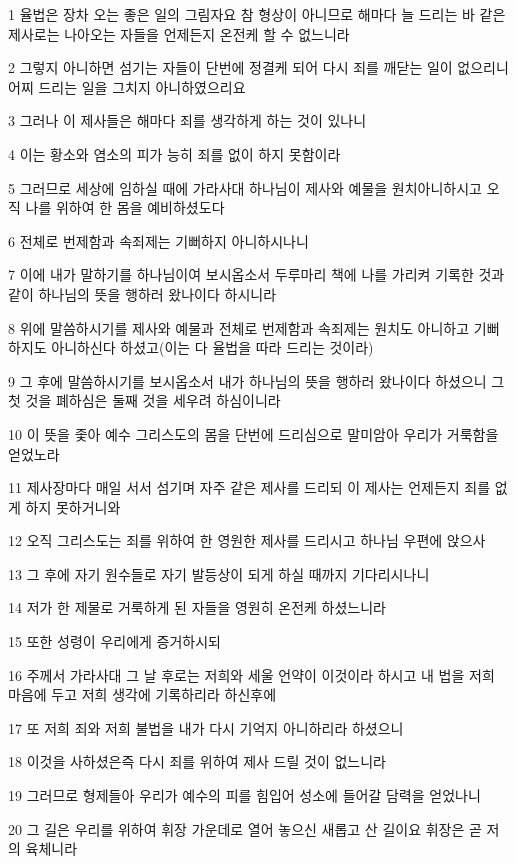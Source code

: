 \par 1 율법은 장차 오는 좋은 일의 그림자요 참 형상이 아니므로 해마다 늘 드리는 바 같은 제사로는 나아오는 자들을 언제든지 온전케 할 수 없느니라
\par 2 그렇지 아니하면 섬기는 자들이 단번에 정결케 되어 다시 죄를 깨닫는 일이 없으리니 어찌 드리는 일을 그치지 아니하였으리요
\par 3 그러나 이 제사들은 해마다 죄를 생각하게 하는 것이 있나니
\par 4 이는 황소와 염소의 피가 능히 죄를 없이 하지 못함이라
\par 5 그러므로 세상에 임하실 때에 가라사대 하나님이 제사와 예물을 원치아니하시고 오직 나를 위하여 한 몸을 예비하셨도다
\par 6 전체로 번제함과 속죄제는 기뻐하지 아니하시나니
\par 7 이에 내가 말하기를 하나님이여 보시옵소서 두루마리 책에 나를 가리켜 기록한 것과 같이 하나님의 뜻을 행하러 왔나이다 하시니라
\par 8 위에 말씀하시기를 제사와 예물과 전체로 번제함과 속죄제는 원치도 아니하고 기뻐하지도 아니하신다 하셨고(이는 다 율법을 따라 드리는 것이라)
\par 9 그 후에 말씀하시기를 보시옵소서 내가 하나님의 뜻을 행하러 왔나이다 하셨으니 그 첫 것을 폐하심은 둘째 것을 세우려 하심이니라
\par 10 이 뜻을 좇아 예수 그리스도의 몸을 단번에 드리심으로 말미암아 우리가 거룩함을 얻었노라
\par 11 제사장마다 매일 서서 섬기며 자주 같은 제사를 드리되 이 제사는 언제든지 죄를 없게 하지 못하거니와
\par 12 오직 그리스도는 죄를 위하여 한 영원한 제사를 드리시고 하나님 우편에 앉으사
\par 13 그 후에 자기 원수들로 자기 발등상이 되게 하실 때까지 기다리시나니
\par 14 저가 한 제물로 거룩하게 된 자들을 영원히 온전케 하셨느니라
\par 15 또한 성령이 우리에게 증거하시되
\par 16 주께서 가라사대 그 날 후로는 저희와 세울 언약이 이것이라 하시고 내 법을 저희 마음에 두고 저희 생각에 기록하리라 하신후에
\par 17 또 저희 죄와 저희 불법을 내가 다시 기억지 아니하리라 하셨으니
\par 18 이것을 사하셨은즉 다시 죄를 위하여 제사 드릴 것이 없느니라
\par 19 그러므로 형제들아 우리가 예수의 피를 힘입어 성소에 들어갈 담력을 얻었나니
\par 20 그 길은 우리를 위하여 휘장 가운데로 열어 놓으신 새롭고 산 길이요 휘장은 곧 저의 육체니라
